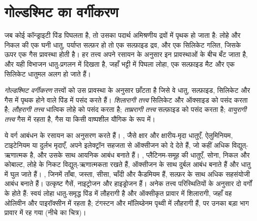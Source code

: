 \section{गोल्डश्मिट का वर्गीकरण}

जब कोई कॉन्ड्राइटी पिंड पिघलता है, तो उसका पदार्थ अमिश्रणीय द्रवों में पृथक हो जाता है:
लोहे और निकल की एक घनी धातु, पर्याप्त सल्फ़र हो तो एक सल्फ़ाइड द्रव, और एक
सिलिकेट गलित, जिसके ऊपर एक गैस प्रावस्था होती है। हर तत्त्व अपने रसायन के अनुसार
इन प्रावस्थाओं के बीच बँट जाता है, और यही विभाजन धातु-प्रगलन में दिखता है,
जहाँ भट्टी में पिघला लोहा, एक सल्फ़ाइड मैट और एक सिलिकेट धातुमल अलग हो
जाते हैं।

\begin{definition}[गोल्डश्मिट वर्गीकरण]
\label{def:b2:elements-in-the-earth:goldschmidt}
\emph{गोल्डश्मिट वर्गीकरण} तत्त्वों को
उस प्रावस्था के अनुसार छाँटता है जिसे वे धातु, सल्फ़ाइड, सिलिकेट और गैस में पृथक होने वाले पिंड में
पसंद करते हैं। \emph{शिलारागी तत्त्व}
सिलिकेट और ऑक्साइड को पसंद करता है; \emph{लौहरागी तत्त्व}
धात्विक लोहे को पसंद करता है; \emph{ताम्ररागी
तत्त्व} सल्फ़ाइड को पसंद करता है; \emph{वायुरागी
तत्त्व} गैस में रहता है, गैस या किसी वाष्पशील
यौगिक के रूप में।
\end{definition}

ये वर्ग आबंधन के रसायन का अनुसरण करते हैं। , जैसे
क्षार और क्षारीय-मृदा धातुएँ, ऐलुमिनियम, टाइटेनियम या दुर्लभ मृदाएँ, अपने
इलेक्ट्रॉन सहजता से ऑक्सीजन को दे देते हैं, जो कहीं अधिक विद्युत्-ऋणात्मक है, और
उसके साथ आयनिक आबंध बनाते हैं। , प्लैटिनम-समूह की धातुएँ, सोना,
निकल और कोबाल्ट, लोहे के निकट विद्युत्-ऋणात्मकता रखते हैं, ऑक्सीजन के साथ दुर्बल आबंध
बनाते हैं और धातु में घुल जाते हैं। , जिनमें ताँबा, जस्ता, सीसा,
चाँदी और कैडमियम हैं, सल्फ़र के साथ अधिक सहसंयोजी आबंध बनाते हैं।
 उत्कृष्ट गैसें, नाइट्रोजन और हाइड्रोजन हैं। अनेक
तत्त्व परिस्थितियों के अनुसार दो वर्गों के होते हैं: स्वयं लोहा
धातु-समृद्ध पिंड में लौहरागी है और ऑक्सीकृत प्रावार में शिलारागी, जहाँ वह
ओलिवीन और पाइरॉक्सीन में रहता है; टंगस्टन और मॉलिब्डेनम पृथ्वी में लौहरागी हैं,
पर उनका बड़ा भाग प्रावार में रह गया (नीचे का चित्र)।

